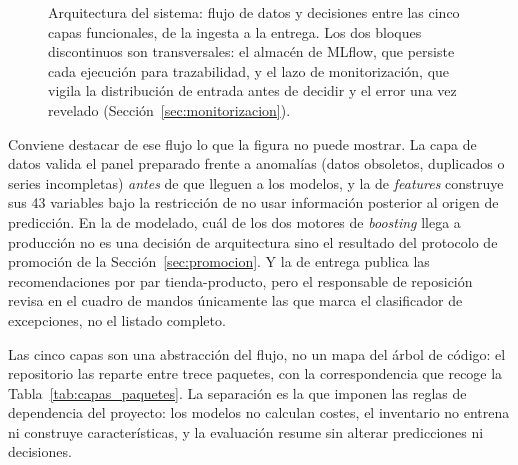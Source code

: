 \begin{figure}[H]
{%
}
\shorthandon{>}%
\caption[Arquitectura del sistema en cinco capas]{Arquitectura del sistema: flujo de datos y decisiones entre las cinco capas funcionales, de la ingesta a la entrega. Los dos bloques discontinuos son transversales: el almacén de MLflow, que persiste cada ejecución para trazabilidad, y el lazo de monitorización, que vigila la distribución de entrada antes de decidir y el error una vez revelado (Sección~\ref{sec:monitorizacion}).}
\label{fig:arquitectura_sistema}
\end{figure}

Conviene destacar de ese flujo lo que la figura no puede mostrar. La capa de datos valida el
panel preparado frente a anomalías (datos obsoletos, duplicados o series incompletas)
\emph{antes} de que lleguen a los modelos, y la de \textit{features} construye sus 43 variables
bajo la restricción de no usar información posterior al origen de predicción. En la de modelado,
cuál de los dos motores de \textit{boosting} llega a producción no es una decisión de
arquitectura sino el resultado del protocolo de promoción de la Sección~\ref{sec:promocion}. Y
la de entrega publica las recomendaciones por par tienda-producto, pero el responsable de
reposición revisa en el cuadro de mandos únicamente las que marca el clasificador de excepciones,
no el listado completo.

Las cinco capas son una abstracción del flujo, no un mapa del árbol de código: el repositorio las reparte entre trece paquetes, con la correspondencia que recoge la Tabla~\ref{tab:capas_paquetes}. La separación es la que imponen las reglas de dependencia del proyecto: los modelos no calculan costes, el inventario no entrena ni construye características, y la evaluación resume sin alterar predicciones ni decisiones.

